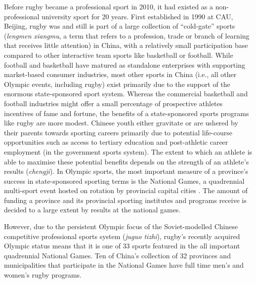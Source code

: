 Before rugby became a professional sport in 2010, it had existed as a non-professional university sport for 20 years.  First established in 1990 at CAU, Beijing, rugby was and still is part of a large collection of ``cold-gate'' sports (\textit{lengmen xiangmu}, a term that refers to a profession, trade or branch of learning that receives little attention) in China, with a relatively small participation base compared to other interactive team sports like basketball or football.  While football and basketball have matured as standalone enterprises with supporting market-based consumer industries, most other sports in China (i.e., all other Olympic events, including rugby) exist primarily due to the support of the enormous state-sponsored sport system.  Whereas the commercial basketball and football industries might offer a small percentage of prospective athletes incentives of fame and fortune, the benefits of a state-sponsored sports programs like rugby are more modest.  Chinese youth either gravitate or are ushered by their parents towards sporting careers primarily due to potential life-course opportunities such as access to tertiary education and post-athletic career employment (in the government sports system).  The extent to which an athlete is able to maximise these potential benefits depends on the strength of an athlete's results (\textit{chengji}).
In Olympic sports, the most important measure of a province's success in state-sponsored sporting terms is the National Games, a quadrennial multi-sport event hosted on rotation by provincial capital cities \citep{Hong2002}.  The amount of funding a province and its provincial sporting institutes and programs receive is decided to a large extent by results at the national games.


However, due to the persistent Olympic focus of the Soviet-modelled Chinese competitive professional sports system (\textit{juguo tizhi}), rugby's recently acquired Olympic status means that it is one of 33 sports featured in the all important quadrennial National Games.  Ten of China's collection of 32 provinces and municipalities that participate in the National Games have full time men's and women's rugby programs.


